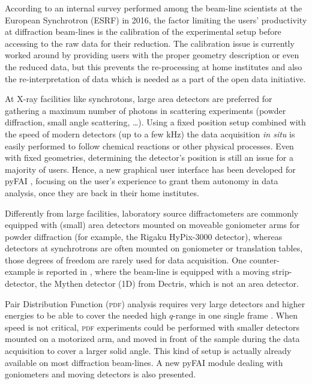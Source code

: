 \documentclass[preprint]{iucr}              %
\begin{document}
According to an internal survey performed among the beam-line scientists at
the European Synchrotron (ESRF) in 2016, the factor limiting the users'
productivity at diffraction beam-lines is the calibration of the experimental
setup before accessing to the raw data for their reduction. 
The calibration issue is currently worked around by providing users with the
proper geometry description or even the reduced data, but this prevents the
re-processing at home institutes and also the re-interpretation of data which
is needed as a part of the open data initiative.

At X-ray facilities like synchrotons, large area detectors are 
preferred for gathering a maximum number of photons in
scattering experiments (powder diffraction, small angle
scattering, \ldots).
Using a fixed position setup combined with the speed of modern detectors (up
to a few kHz) the data acquisition \textit{in situ} is easily
performed to follow chemical reactions or other physical processes.
Even with fixed geometries, determining the detector's position is
still an issue for a majority of users. 
Hence, a new graphical user interface has been developed for pyFAI
\cite{pyFAI_0.18}, focusing on the user's experience to grant them autonomy in
data analysis, once they are back in their home institutes.

Differently from large facilities, laboratory source diffractometers
are commonly equipped with (small) area detectors mounted on moveable goniometer
arms for powder diffraction (for example, the Rigaku HyPix-3000 detector),
whereas detectors at synchrotrons are often mounted on goniometer or
translation tables, those degrees of freedom are rarely used for data
acquisition.
One counter-example is reported in \cite{Gao:kc5032}, where the beam-line
is equipped with a moving strip-detector, the Mythen detector (1D) from Dectris,
which is not an area detector.




Pair Distribution Function (\textsc{pdf}) analysis requires very large
detectors and higher energies to be able to cover the needed high $q$-range in
one single frame \cite{Chupas:wf5000}.
When speed is not critical, \textsc{pdf} experiments could be performed
with smaller detectors mounted on a motorized arm, and moved in front of
the sample during the data acquisition to cover a larger solid angle. 
This kind of setup is actually already available on most diffraction
beam-lines. 
A new pyFAI module dealing with goniometers and moving detectors is also presented.
\end{document}
